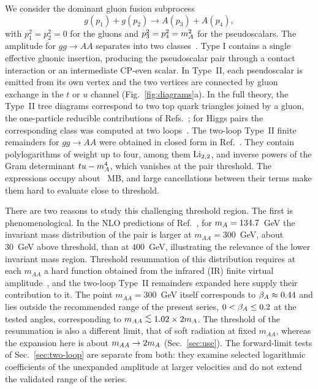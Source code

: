 We consider the dominant gluon fusion subprocess
\begin{equation}
 g(p_1)+g(p_2)\to A(p_3)+A(p_4),
 \label{eq:amp}
\end{equation}
with $p_1^2=p_2^2=0$ for the gluons and $p_3^2=p_4^2=m_A^2$ for the pseudoscalars.
The amplitude for $gg\to AA$ separates into two classes~\cite{Bhattacharya:2019bmd}.
Type I contains a single effective gluonic insertion, producing the pseudoscalar pair through a contact interaction or an intermediate CP-even scalar.
In Type~II, each pseudoscalar is emitted from its own vertex and the two vertices are connected by gluon exchange in the $t$ or $u$ channel (Fig.~\ref{fig:diagrams}a). In the full theory, the Type~II tree diagrams correspond to two top quark triangles joined by a gluon, the one-particle reducible contributions of Refs.~\cite{DawsonDittmaierSpira1998,Baglio:2023euv}; for Higgs pairs the corresponding class was computed at two loops~\cite{Banerjee:2018lfq}. The two-loop Type~II finite remainders for $gg\to AA$ were obtained in closed form in Ref.~\cite{Bhattacharya:2019bmd}. They contain polylogarithms of weight up to four, among them $\operatorname{Li}_{2,2}$, and inverse powers of the Gram determinant $tu-m_A^4$, which vanishes at the pair threshold. The expressions occupy about \PublishedTwoLoopMB~MB, and large cancellations between their terms make them hard to evaluate close to threshold.

There are two reasons to study this challenging threshold region. The first is phenomenological. In the NLO predictions of Ref.~\cite{Baglio:2023euv}, for $m_A=134.7$~GeV the invariant mass distribution of the pair is larger at $m_{AA}=300$~GeV, about 30~GeV above threshold, than at 400~GeV, illustrating the relevance of the lower invariant mass region. Threshold resummation of this distribution requires at each $m_{AA}$ a hard function obtained from the infrared (IR) finite virtual amplitude~\cite{Sterman:1986aj,Catani:1989ne,deFlorian:2012za,deFlorian:2015moa,Bhattacharya:2021nsv}, and the two-loop Type~II remainders expanded here supply their contribution to it. The point $m_{AA}=300$~GeV itself corresponds to $\beta_A\approx0.44$ and lies outside the recommended range of the present series, $0<\beta_A\leq0.2$ at the tested angles, corresponding to $m_{AA}\lesssim\SeriesMassRatio\times2\mA$. The threshold of the resummation is also a different limit, that of soft radiation at fixed $m_{AA}$, whereas the expansion here is about $m_{AA}\to2m_A$ (Sec.~\ref{sec:use}). The forward-limit tests of Sec.~\ref{sec:two-loop} are separate from both: they examine selected logarithmic coefficients of the unexpanded amplitude at larger velocities and do not extend the validated range of the series.

